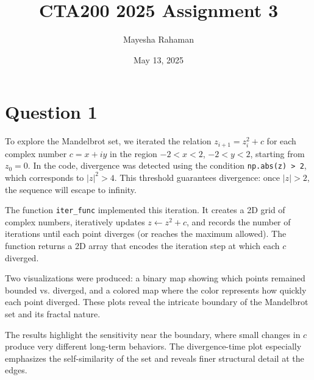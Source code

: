 \documentclass[11pt]{article}
\title{CTA200 2025 Assignment 3}
\author{Mayesha Rahaman}
\date{May 13, 2025}
\begin{document}
\maketitle

\section*{Question 1}

To explore the Mandelbrot set, we iterated the relation $z_{i+1} = z_i^2 + c$ for each complex number $c = x + iy$ in the region $-2 < x < 2$, $-2 < y < 2$, starting from $z_0 = 0$. In the code, divergence was detected using the condition \texttt{np.abs(z) > 2}, which corresponds to $|z|^2 > 4$. This threshold guarantees divergence: once $|z| > 2$, the sequence will escape to infinity.

The function \texttt{iter\_func} implemented this iteration. It creates a 2D grid of complex numbers, iteratively updates $z \leftarrow z^2 + c$, and records the number of iterations until each point diverges (or reaches the maximum allowed). The function returns a 2D array that encodes the iteration step at which each $c$ diverged.

Two visualizations were produced: a binary map showing which points remained bounded vs. diverged, and a colored map where the color represents how quickly each point diverged. These plots reveal the intricate boundary of the Mandelbrot set and its fractal nature.

The results highlight the sensitivity near the boundary, where small changes in $c$ produce very different long-term behaviors. The divergence-time plot especially emphasizes the self-similarity of the set and reveals finer structural detail at the edges.
\end{document}
